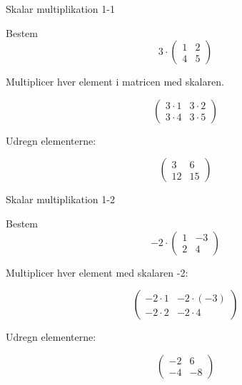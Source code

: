 \documentclass{article}
\begin{document}

\tableofcontents
\newpage

\begin{exercise}{Skalar multiplikation 1-1}

Bestem
\[
3 \cdot \begin{pmatrix} 1 & 2 \\ 4 & 5 \end{pmatrix}
\]


\hint

Multiplicer hver element i matricen med skalaren.

\hint
\[
\begin{pmatrix} 3 \cdot 1 & 3 \cdot 2 \\ 3 \cdot 4 & 3 \cdot 5 \end{pmatrix}
\]

\hint

Udregn elementerne:

\hint
\[
\begin{pmatrix} 3 & 6 \\ 12 & 15 \end{pmatrix}
\]

\end{exercise}

\newpage

\begin{exercise}{Skalar multiplikation 1-2}

Bestem
\[
-2 \cdot \begin{pmatrix} 1 & -3 \\ 2 & 4 \end{pmatrix}
\]


\hint

Multiplicer hver element med skalaren -2:

\hint
\[
\begin{pmatrix} -2 \cdot 1 & -2 \cdot (-3) \\ -2 \cdot 2 & -2 \cdot 4 \end{pmatrix}
\]

\hint

Udregn elementerne:

\hint
\[
\begin{pmatrix} -2 & 6 \\ -4 & -8 \end{pmatrix}
\]

\end{exercise}
\end{document}

